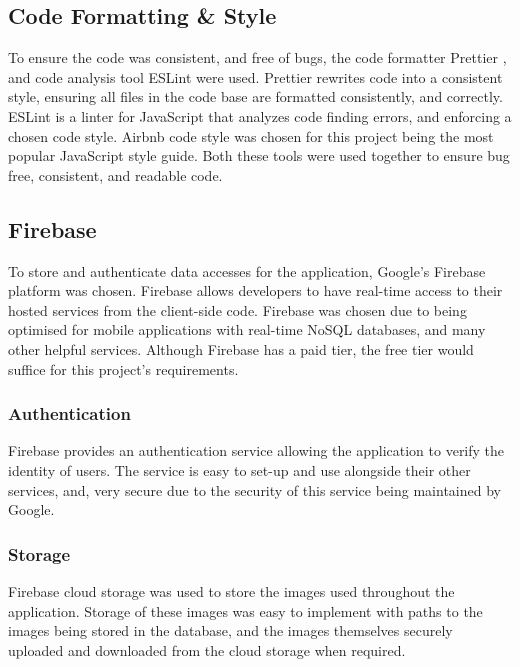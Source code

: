 \subsection{Code Formatting \& Style} \label{CodeF&S}
To ensure the code was consistent, and free of bugs, the code formatter Prettier \cite{prettier}, and code analysis tool ESLint \cite{eslint} were used. Prettier rewrites code into a consistent style, ensuring all files in the code base are formatted consistently, and correctly. ESLint is a linter for JavaScript that analyzes code finding errors, and enforcing a chosen code style. Airbnb \cite{airbnb} code style was chosen for this project being the most popular JavaScript style guide. Both these tools were used together to ensure bug free, consistent, and readable code. 
\subsection{Firebase}\label{firebaseSection}
To store and authenticate data accesses for the application, Google's Firebase \cite{firebase} platform was chosen. Firebase allows developers to have real-time access to their hosted services from the client-side code. Firebase was chosen due to being optimised for mobile applications with real-time NoSQL \cite{nosql} databases, and many other helpful services. Although Firebase has a paid tier, the free tier would suffice for this project's requirements.     
\subsubsection{Authentication}
Firebase provides an authentication service allowing the application to verify the identity of users. The service is easy to set-up and use alongside their other services, and, very secure due to the security of this service being maintained by Google.
\subsubsection{Storage}
Firebase cloud storage was used to store the images used throughout the application. Storage of these images was easy to implement with paths to the images being stored in the database, and the images themselves securely uploaded and downloaded from the cloud storage when required.
